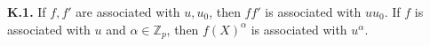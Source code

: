 \textbf{K.1.} If $f, f'$ are associated with $u, u_0$, then $f f'$ is associated with $u u_0$. If $f$ is associated with $u$ and $\alpha \in \mathbb{Z}_p$, then $f(X)^\alpha$ is associated with $u^\alpha$.
